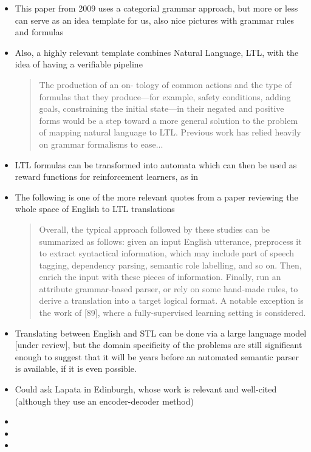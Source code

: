 \documentclass[a4paper, 11pt]{article}
\begin{document}
\begin{itemize}

\item This paper \cite{5152776} from 2009 uses a categorial grammar approach, but more or less
  can serve as an idea template for us, also nice pictures with grammar rules
  and formulas
\item Also, a highly relevant template combines Natural Language, LTL, with the
  idea of having a verifiable pipeline \cite{provCorrectNatControl} 

\begin{quote}
The production of an on-
tology of common actions and the type of formulas that
they produce—for example, safety conditions, adding goals,
constraining the initial state—in their negated and positive
forms would be a step toward a more general solution to
the problem of mapping natural language to LTL. Previous
work has relied heavily on grammar formalisms to ease...
\cite{provCorrectNatControl} 
\end{quote}

\item LTL formulas can be transformed into automata which can then be used as reward functions for reinforcement learners, as in \cite{ltlRein}

\item  The following is one of the more relevant quotes from a paper reviewing
  the whole space of English to LTL translations
  \begin{quote}
Overall, the typical approach followed by these studies can be summarized as follows:
given an input English utterance, preprocess it to extract syntactical information, which may
include part of speech tagging, dependency parsing, semantic role labelling, and so on. Then,
enrich the input with these pieces of information. Finally, run an attribute grammar-based
parser, or rely on some hand-made rules, to derive a translation into a target logical format.
A notable exception is the work of [89], where a fully-supervised learning setting is considered.
\cite{brunello_et_al}
\end{quote}
\item Translating between English and STL can be done via a large language model 
\cite{he2021english} [under review], but the domain specificity of the problems
are still significant enough to suggest that it will be years before an
automated semantic parser is available, if it is even possible. 
\item Could ask Lapata in Edinburgh, whose work \cite{dong-lapata-2016-language}
  is relevant and well-cited (although they use an encoder-decoder method)
\item
\item
\item

\end{itemize}
\end{document}
